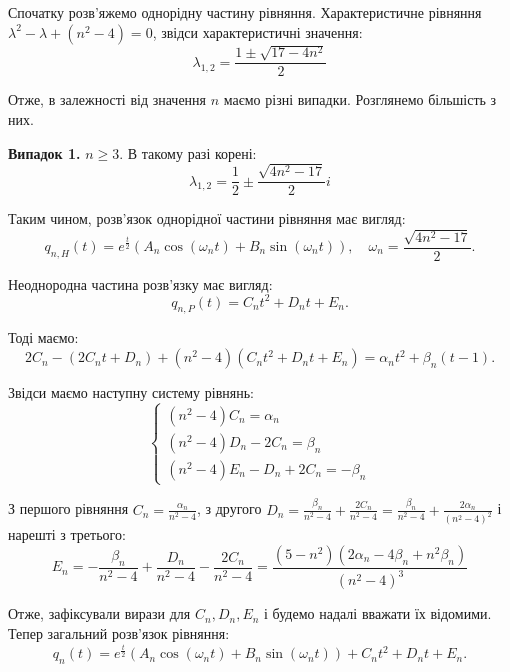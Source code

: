\documentclass{hw_template}
\begin{document}
Спочатку розв'яжемо однорідну частину рівняння. Характеристичне рівняння $\lambda^2 - \lambda + (n^2-4) = 0$, звідси характеристичні значення:
\begin{equation*}
    \lambda_{1,2} = \frac{1 \pm \sqrt{17-4n^2}}{2}
\end{equation*}

Отже, в залежності від значення $n$ маємо різні випадки. Розглянемо більшість з них.

\textbf{Випадок 1.} $n \geq 3$. В такому разі корені:
\begin{equation*}
    \lambda_{1,2} = \frac{1}{2} \pm \frac{\sqrt{4n^2-17}}{2}i
\end{equation*}

Таким чином, розв'язок однорідної частини рівняння має вигляд:
\begin{equation*}
    q_{n,H}(t) = e^{\frac{t}{2}}\left(A_n \cos\left(\omega_n t\right) + B_n \sin\left(\omega_n t\right)\right), \quad \omega_n = \frac{\sqrt{4n^2-17}}{2}.
\end{equation*}

Неоднородна частина розв'язку має вигляд:
\begin{equation*}
    q_{n,P}(t) = C_nt^2 + D_nt + E_n.
\end{equation*}

Тоді маємо:
\begin{equation*}
    2C_n - (2C_nt + D_n) + (n^2-4)(C_nt^2 + D_nt + E_n) = \alpha_nt^2 + \beta_n(t-1).
\end{equation*}

Звідси маємо наступну систему рівнянь:
\begin{equation*}
    \begin{cases}
        (n^2-4)C_n = \alpha_n \\
        (n^2-4)D_n - 2C_n = \beta_n \\
        (n^2-4)E_n - D_n + 2C_n = -\beta_n
    \end{cases}
\end{equation*}

З першого рівняння $C_n = \frac{\alpha_n}{n^2-4}$, з другого $D_n = \frac{\beta_n}{n^2-4} + \frac{2C_n}{n^2-4} = \frac{\beta_n}{n^2-4} + \frac{2\alpha_n}{(n^2-4)^2}$
і нарешті з третього:
\begin{equation*}
    E_n = -\frac{\beta_n}{n^2-4} + \frac{D_n}{n^2-4} - \frac{2C_n}{n^2-4} = \frac{(5-n^2)(2\alpha_n-4\beta_n+n^2\beta_n)}{(n^2-4)^3}
\end{equation*}

Отже, зафіксували вирази для $C_n,D_n,E_n$ і будемо надалі вважати їх відомими.
Тепер загальний розв'язок рівняння:
\begin{equation*}
    q_n(t) = e^{\frac{t}{2}}\left(A_n \cos\left(\omega_n t\right) + B_n \sin\left(\omega_n t\right)\right) + C_nt^2 + D_nt + E_n.
\end{equation*}
\end{document}
